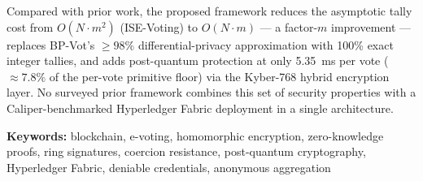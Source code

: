 Compared with prior work, the proposed framework reduces the asymptotic tally cost from $O(N \cdot m^{2})$ (ISE-Voting) to $O(N \cdot m)$ --- a factor-$m$ improvement --- replaces BP-Vot's $\geq 98\%$ differential-privacy approximation with 100\% exact integer tallies, and adds post-quantum protection at only 5.35~ms per vote ($\approx 7.8\%$ of the per-vote primitive floor) via the Kyber-768 hybrid encryption layer. No surveyed prior framework combines this set of security properties with a Caliper-benchmarked Hyperledger Fabric deployment in a single architecture.

\vspace{1cm}

\noindent
\textbf{Keywords:} blockchain, e-voting, homomorphic encryption, zero-knowledge proofs, ring signatures, coercion resistance, post-quantum cryptography, Hyperledger Fabric, deniable credentials, anonymous aggregation
